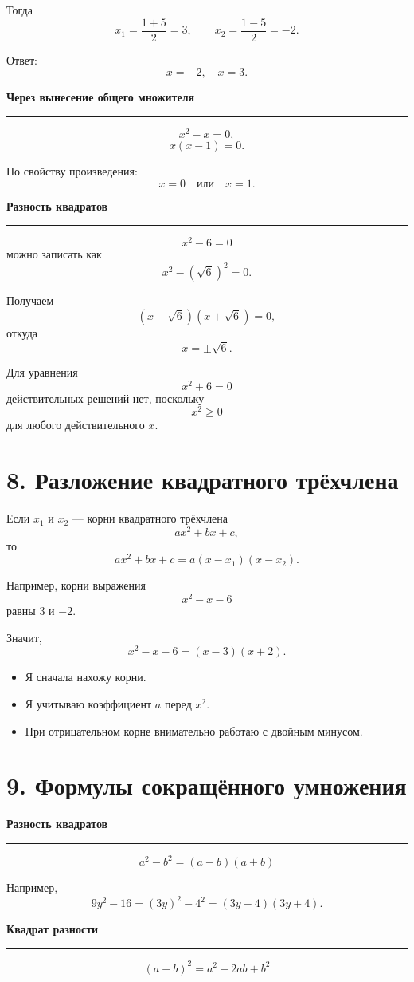 \documentclass[a4paper,12pt]{article}
\newcommand{\checkitem}{\item[$\square$]}
\newcommand{\accentline}{%
    \vspace{0.2em}
    {\color{accent}\rule{\linewidth}{0.6pt}}
    \vspace{0.5em}
}
\newcommand{\topic}[1]{%
    \vspace{0.5em}
    {\large\bfseries\color{darkaccent}#1}\par
    \accentline
}
\begin{document}
Тогда
\[
x_1=\frac{1+5}{2}=3,
\qquad
x_2=\frac{1-5}{2}=-2.
\]

Ответ:
\[
x=-2,\quad x=3.
\]

\topic{Через вынесение общего множителя}

\[
x^2-x=0,
\]
\[
x(x-1)=0.
\]

По свойству произведения:
\[
x=0
\quad\text{или}\quad
x=1.
\]

\topic{Разность квадратов}

\[
x^2-6=0
\]
можно записать как
\[
x^2-(\sqrt6)^2=0.
\]

Получаем
\[
(x-\sqrt6)(x+\sqrt6)=0,
\]
откуда
\[
x=\pm\sqrt6.
\]

Для уравнения
\[
x^2+6=0
\]
действительных решений нет, поскольку
\[
x^2\ge0
\]
для любого действительного $x$.


\section*{\color{darkaccent}8. Разложение квадратного трёхчлена}

Если $x_1$ и $x_2$ --- корни квадратного трёхчлена
\[
ax^2+bx+c,
\]
то
\[
\boxed{
ax^2+bx+c
=
a(x-x_1)(x-x_2)
}.
\]

Например, корни выражения
\[
x^2-x-6
\]
равны $3$ и $-2$.

Значит,
\[
x^2-x-6
=
(x-3)(x+2).
\]

\begin{itemize}
\checkitem Я сначала нахожу корни.
\checkitem Я учитываю коэффициент $a$ перед $x^2$.
\checkitem При отрицательном корне внимательно работаю с двойным минусом.
\end{itemize}


\section*{\color{darkaccent}9. Формулы сокращённого умножения}

\topic{Разность квадратов}

\[
\boxed{a^2-b^2=(a-b)(a+b)}
\]

Например,
\[
9y^2-16
=
(3y)^2-4^2
=
(3y-4)(3y+4).
\]

\topic{Квадрат разности}

\[
\boxed{(a-b)^2=a^2-2ab+b^2}
\]
\end{document}
